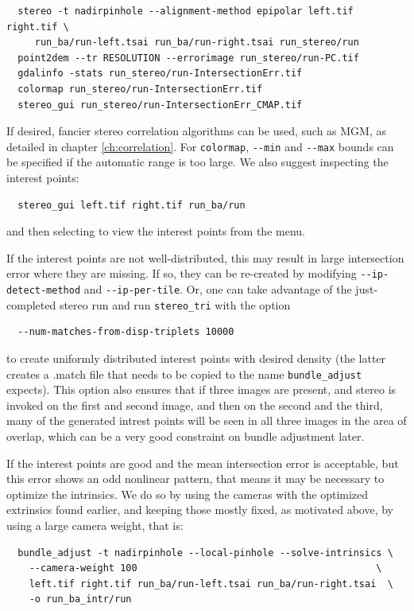 \begin{verbatim}
  stereo -t nadirpinhole --alignment-method epipolar left.tif right.tif \
     run_ba/run-left.tsai run_ba/run-right.tsai run_stereo/run 
  point2dem --tr RESOLUTION --errorimage run_stereo/run-PC.tif
  gdalinfo -stats run_stereo/run-IntersectionErr.tif
  colormap run_stereo/run-IntersectionErr.tif
  stereo_gui run_stereo/run-IntersectionErr_CMAP.tif
\end{verbatim}

If desired, fancier stereo correlation algorithms can be used, such as MGM, as detailed in  
chapter \ref{ch:correlation}. For \texttt{colormap}, \texttt{-\/-min} and \texttt{-\/-max} 
bounds can be specified if the automatic range is too large. We also suggest inspecting
the interest points:
\begin{verbatim}
  stereo_gui left.tif right.tif run_ba/run
\end{verbatim}
and then selecting to view the interest points from the menu. 

If the interest points are not well-distributed, this may result in large intersection error
where they are missing. If so, they can be re-created by modifying \texttt{-\/-ip-detect-method}
and \texttt{-\/-ip-per-tile}. Or, one can take advantage of the just-completed stereo run
and run \texttt{stereo\_tri} with the option 
\begin{verbatim} 
  --num-matches-from-disp-triplets 10000
\end{verbatim}

to create
uniformly distributed interest points with desired density (the latter creates a .match file
that needs to be copied to the name \texttt{bundle\_adjust} expects). This option also ensures
that if three images are present, and stereo is invoked on the first and second image, and then on the second and the third, many of the generated intrest points will be seen in all three images
in the area of overlap, which can be a very good constraint on bundle adjustment later.  

If the interest points are good and the mean intersection error is
acceptable, but this error shows an odd nonlinear pattern, that means
it may be necessary to optimize the intrinsics. We do so by using the
cameras with the optimized extrinsics found earlier, and keeping those
mostly fixed, as motivated above, by using a large camera weight,
that is:

\begin{verbatim}
  bundle_adjust -t nadirpinhole --local-pinhole --solve-intrinsics \
    --camera-weight 100                                          \  
    left.tif right.tif run_ba/run-left.tsai run_ba/run-right.tsai  \
    -o run_ba_intr/run
\end{verbatim}

